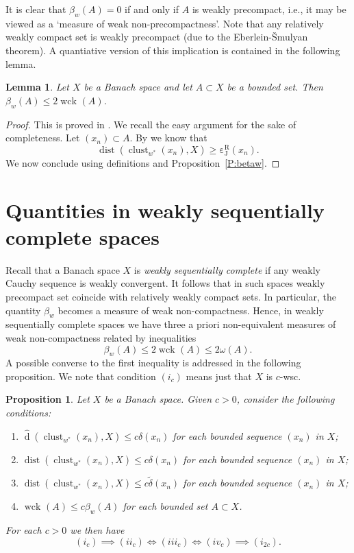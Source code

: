 \documentclass{amsart}
\numberwithin{equation}{section}
\newtheorem{lemma}[thm]{Lemma}
\newtheorem{prop}[thm]{Proposition}
\theoremstyle{definition}
\def\dist{\operatorname{dist}}
\def\iff{\Longleftrightarrow}
\def\dh{\widehat{\operatorname{d}}}
\def\clu#1{\operatorname{clust}_{w^*}(#1)}
\def\wde#1{\widetilde{\delta}\left(#1\right)}
\def\de#1{\delta\left(#1\right)}
\def\cjr#1{\operatorname{\varepsilon_J^R}\left(#1\right)}
\newcommand{\wck}[2][]{\operatorname{wck}_{#1}\left(#2\right)}
\begin{document}
It is clear that $\beta_w(A)=0$ if and only if $A$ is weakly precompact, i.e., it may be viewed as a `measure of weak non-precompactness'. Note that any relatively weakly compact set is weakly precompact (due to the Eberlein-\v{S}mulyan theorem). A quantiative version of this implication is contained in the following lemma.

\begin{lemma}\label{L:betaw-wck}
     Let $X$ be a Banach space and let $A\subset X$ be a bounded set. Then $\beta_w(A)\le2\wck{A}$.
\end{lemma}

\begin{proof}
    This is proved in \cite[Theorem 3.2(2)]{kania-qgp}. We recall the easy argument for the sake of completeness.
    Let $(x_n)\subset A$. By \cite[Lemma 5]{wesecom} we know that
    $$\dist(\clu{x_n},X)\ge \cjr{x_n}.$$
    We now conclude using definitions and Proposition~\ref{P:betaw}.
\end{proof}

\section{Quantities in weakly sequentially complete spaces}\label{sec:wsc}

Recall that a Banach space $X$ is \emph{weakly sequentially complete} if any weakly Cauchy sequence is weakly convergent. It follows that in such spaces weakly precompact set coincide with relatively weakly compact sets. In particular, the quantity $\beta_w$ becomes a measure of weak non-compactness.
Hence, in weakly sequentially complete spaces we have three a priori non-equivalent measures of weak non-compactness related by inequalities
$$\beta_w(A)\le 2\wck{A}\le2\omega(A).$$
A possible converse to the first inequality is addressed in the following proposition. We note that condition $(i_c)$ means just that $X$ is $c$-wsc.

\begin{prop}\label{P:wsc}
    Let $X$ be a Banach space. Given $c>0$, consider the following conditions:
    \begin{enumerate}[$(i_c)$]
        \item $\dh(\clu{x_n},X)\le c\de{x_n}$ for each bounded sequence $(x_n)$ in $X$;
        \item $\dist(\clu{x_n},X)\le c\de{x_n}$ for each bounded sequence $(x_n)$ in $X$;
        \item $\dist(\clu{x_n},X)\le c\wde{x_n}$ for each bounded sequence $(x_n)$ in $X$;
        \item $\wck{A}\le c\beta_w(A)$ for each bounded set $A\subset X$.
    \end{enumerate}
   For each $c>0$ we then have 
   $$(i_c)\implies (ii_c)\iff(iii_c)\iff(iv_c)\implies (i_{2c}).$$
\end{prop}
\end{document}
